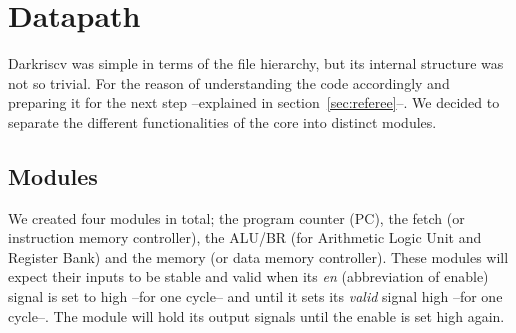 \section{Datapath}
\label{sec:datapath}

Darkriscv was simple in terms of the file hierarchy, but its internal structure
was not so trivial. For the reason of understanding the code accordingly and
preparing it for the next step --explained in section~\ref{sec:referee}--. We decided to
separate the different functionalities of the core into distinct modules.

\subsection{Modules}

We created four modules in total; the program counter (PC), the fetch (or
instruction memory controller), the ALU/BR (for Arithmetic Logic Unit and
Register Bank) and the memory (or data memory controller). These modules will
expect their inputs to be stable and valid when its \textit{en} (abbreviation of
enable) signal is set to high --for one cycle-- and until it sets its \textit{valid}
signal high --for one cycle--. The module will hold its output signals until the
enable is set high again.


